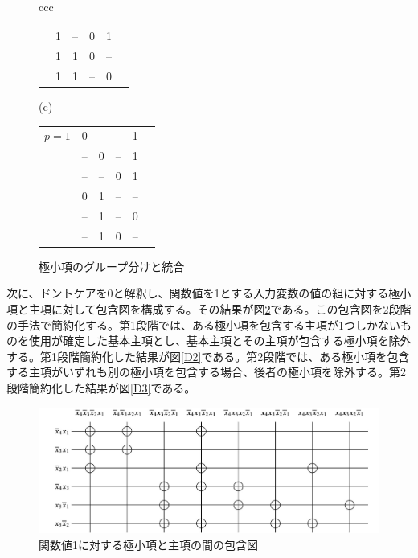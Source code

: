 \documentclass[10pt,dvipdfmx]{jsarticle}
\newcommand\subcaption[1]{\begin{center}#1\end{center}}
\begin{document}
\begin{figure}[htbp]
\begin{tabular}{ccc}
\begin{minipage}{.33\textwidth}
\begin{tabular}{|c|ccccc|}
        & 1 & -- & 0 & 1 & \checkmark \\
        & 1 & 1 & 0 & -- & \checkmark \\
        & 1 & 1 & -- & 0 & \checkmark \\ \hline
		\end{tabular}
	\end{minipage}
	\begin{minipage}{.33\textwidth}
		\centering
        \subcaption{(c)}
		\begin{tabular}{|c|ccccc|} \hline			
		$p = 1$ & 0 & -- & -- & 1 &  \\
        & -- & 0 & -- & 1 &  \\
        & -- & -- & 0 & 1 &  \\
        & 0 & 1 & -- & -- &  \\
        & -- & 1 & -- & 0 &  \\
        & -- & 1 & 0 & -- &  \\ \hline
        \end{tabular}
	\end{minipage}
	\end{tabular}
    \caption {極小項のグループ分けと統合}
    \label{D0}
\end{figure}

次に、ドントケアを0と解釈し、関数値を1とする入力変数の値の組に対する極小項と主項に対して包含図を構成する。その結果が図\ref{D1}である。この包含図を2段階の手法で簡約化する。第1段階では、ある極小項を包含する主項が1つしかないものを使用が確定した基本主項とし、基本主項とその主項が包含する極小項を除外する。第1段階簡約化した結果が図\ref{D2}である。第2段階では、ある極小項を包含する主項がいずれも別の極小項を包含する場合、後者の極小項を除外する。第2段階簡約化した結果が図\ref{D3}である。


\begin{figure}
\begin{center}
\includegraphics[width=15cm]{D1.jpg}
\end{center}
\caption{関数値1に対する極小項と主項の間の包含図}
\label{D1}
\end{figure}
\end{document}
